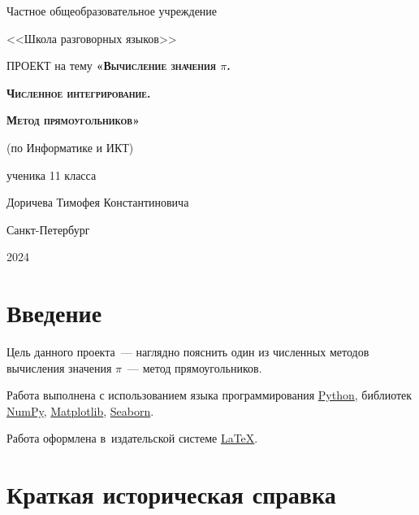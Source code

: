 \documentclass[a4paper,12pt]{article}
\begin{document}
\thispagestyle{empty}

\begin{center}
    {\huge
    Частное общеобразовательное учреждение
    
    <<Школа разговорных языков>>
    }
    \vfill
    \vfill
    \vfill
    \vfill
    {\huge \textsc{ПРОЕКТ}}
    \vfill
    {\huge на тему}
    \vfill
{\huge \textsc{\textbf{«Вычисление значения $\pi$.}}}

\vspace{0.5cm}

{\huge \textsc{\textbf{Численное интегрирование.}}}

\vspace{0.5cm}

{\huge \textsc{\textbf{Метод прямоугольников»}}}

\vfill
{\huge (по Информатике и ИКТ)}

\vfill 
    
    \begin{flushright}
    {\Large ученика 11 класса 
    
    \vspace{0.5cm}

    Доричева Тимофея Константиновича}
    \end{flushright}
    \vfill
    {\Large Санкт-Петербург
    
    \vspace{0.5cm}

    2024}
\end{center}
\pagebreak

\tableofcontents

\section{Введение}

Цель данного проекта~--- наглядно пояснить один из численных методов вычисления значения $\pi$~--- метод прямоугольников.

Работа выполнена с использованием языка программирования \href{https://www.python.org/}{Python}, библиотек \href{https://numpy.org/}{NumPy}, \href{https://matplotlib.org/}{Matplotlib}, \href{https://seaborn.pydata.org/}{Seaborn}. 

Работа оформлена в~издательской системе \href{https://ru.wikipedia.org/wiki/LaTeX}{\LaTeX}.


\section{Краткая историческая справка}
\end{document}
